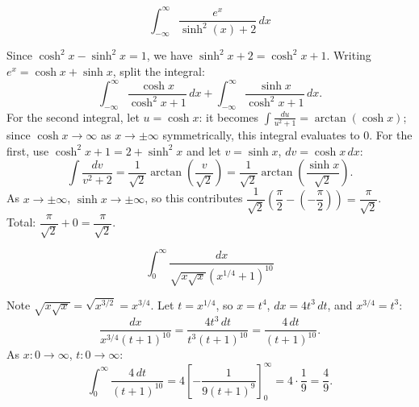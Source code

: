 \begin{questions}
\question \[\int_{-\infty}^\infty \frac{e^x}{\sinh^2(x)+2}\,dx\]
\begin{solution}
Since $\cosh^2x-\sinh^2x=1$, we have $\sinh^2x+2=\cosh^2x+1$. Writing $e^x=\cosh x+\sinh x$, split the integral:
\[
\int_{-\infty}^\infty \frac{\cosh x}{\cosh^2x+1}\,dx+\int_{-\infty}^\infty \frac{\sinh x}{\cosh^2x+1}\,dx.
\]
For the second integral, let $u=\cosh x$: it becomes $\displaystyle\int \frac{du}{u^2+1}=\arctan(\cosh x)$; since $\cosh x\to\infty$ as $x\to\pm\infty$ symmetrically, this integral evaluates to $0$.
For the first, use $\cosh^2x+1=2+\sinh^2x$ and let $v=\sinh x$, $dv=\cosh x\,dx$:
\[
\int \frac{dv}{v^2+2}=\frac{1}{\sqrt2}\arctan\!\left(\frac{v}{\sqrt2}\right)=\frac{1}{\sqrt2}\arctan\!\left(\frac{\sinh x}{\sqrt2}\right).
\]
As $x\to\pm\infty$, $\sinh x\to\pm\infty$, so this contributes $\dfrac{1}{\sqrt2}\left(\dfrac\pi2-\left(-\dfrac\pi2\right)\right)=\dfrac{\pi}{\sqrt2}$.
Total: $\dfrac{\pi}{\sqrt2}+0=\dfrac{\pi}{\sqrt2}$.
\end{solution}

\question \[\int_0^\infty \frac{dx}{\sqrt{x\sqrt{x}}\left(x^{1/4}+1\right)^{10}}\]
\begin{solution}
Note $\sqrt{x\sqrt x}=\sqrt{x^{3/2}}=x^{3/4}$. Let $t=x^{1/4}$, so $x=t^4$, $dx=4t^3\,dt$, and $x^{3/4}=t^3$:
\[
\frac{dx}{x^{3/4}(t+1)^{10}}=\frac{4t^3\,dt}{t^3(t+1)^{10}}=\frac{4\,dt}{(t+1)^{10}}.
\]
As $x:0\to\infty$, $t:0\to\infty$:
\[
\int_0^\infty \frac{4\,dt}{(t+1)^{10}}=4\left[-\frac{1}{9(t+1)^9}\right]_0^\infty=4\cdot\frac19=\frac49.
\]
\end{solution}

\end{questions}

